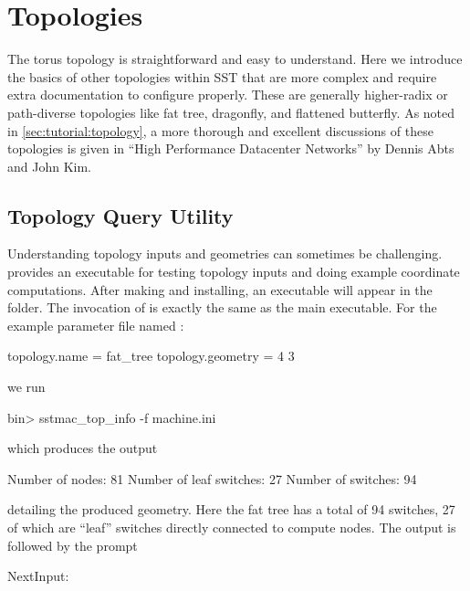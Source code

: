 
\chapter{Topologies}
\label{chapter:topologies}


The torus topology is straightforward and easy to understand.
Here we introduce the basics of other topologies within SST that are more complex and require extra documentation to configure properly.
These are generally higher-radix or path-diverse topologies like fat tree, dragonfly, and flattened butterfly.  
As noted in \ref{sec:tutorial:topology}, a more thorough and excellent discussions of these topologies is given in ``High Performance Datacenter Networks'' by Dennis Abts and John Kim.

\section{Topology Query Utility}
\label{sec:topologyQuery}
Understanding topology inputs and geometries can sometimes be challenging.
\sstmacro provides an executable for testing topology inputs and doing example coordinate computations.
After making and installing, an executable  will appear in the  folder.
The invocation of  is exactly the same as the main  executable.
For the example parameter file named :

\begin{ViFile}
topology.name = fat_tree
topology.geometry = 4 3
\end{ViFile}

we run

\begin{ShellCmd}
bin> sstmac_top_info -f machine.ini
\end{ShellCmd}
which produces the output

\begin{ViFile}
Number of nodes:         81
Number of leaf switches: 27
Number of switches:      94
\end{ViFile}

detailing the produced geometry.  Here the fat tree has a total of 94 switches, 27 of which are ``leaf'' switches directly connected to compute nodes.
The output is followed by the prompt

\begin{ShellCmd}
NextInput: 
\end{ShellCmd}

